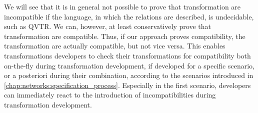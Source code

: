 
We will see that it is in general not possible to prove that transformation are incompatible if the language, in which the relations are described, is undecidable, such as \gls{QVTR}.
We can, however, at least conservatively prove that transformation are compatible.
Thus, if our approach proves compatibility, the transformation are actually compatible, but not vice versa.
This enables transformations developers to check their transformations for compatibility both on-the-fly during transformation development, if developed for a specific scenario, or a posteriori during their combination, according to the scenarios introduced in \autoref{chap:networks:specification_process}.
Especially in the first scenario, developers can immediately react to the introduction of incompatibilities during transformation development.






